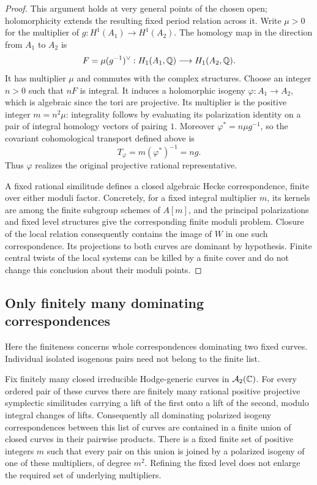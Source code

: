 \begin{proof}
This argument holds at very general points of the chosen open;
holomorphicity extends the resulting fixed period relation across it.
Write $\mu>0$ for the multiplier of
$g:H^1(A_1)\to H^1(A_2)$.  The homology map in the direction from $A_1$
to $A_2$ is
\[
 F=\mu(g^{-1})^\vee:H_1(A_1,\mathbb Q)\longrightarrow H_1(A_2,\mathbb Q).
\]
It has multiplier $\mu$ and commutes with the complex structures.
Choose an integer $n>0$ such that $nF$ is integral.  It induces a
holomorphic isogeny $\varphi:A_1\to A_2$, which is algebraic since the
tori are projective.  Its multiplier is the positive integer
$m=n^2\mu$: integrality follows by evaluating its polarization identity
on a pair of integral homology vectors of pairing $1$.
Moreover $\varphi^*=n\mu g^{-1}$, so the covariant cohomological
transport defined above is
\[
 T_\varphi=m(\varphi^*)^{-1}=ng.
\]
Thus $\varphi$ realizes the original projective rational representative.

A fixed rational similitude defines a
closed algebraic Hecke correspondence, finite over either moduli
factor.  Concretely, for a fixed integral multiplier $m$, its kernels
are among the finite subgroup schemes of $A[m]$, and the principal
polarizations and fixed level structures give the corresponding finite
moduli problem.  Closure of the local relation consequently contains
the image of $W$ in one such correspondence.  Its projections to both
curves are dominant by hypothesis.  Finite central twists of the local
systems can be killed by a finite cover and do not change this
conclusion about their moduli points.
\end{proof}

\subsection{Only finitely many dominating correspondences}

Here the finiteness concerns whole correspondences dominating two fixed
curves.  Individual isolated isogenous pairs need not belong to the
finite list.

\begin{proposition}
\label{prop:finite-correspondences}
Fix finitely many closed irreducible Hodge-generic curves in
$\mathcal A_2(\mathbb C)$.  For every ordered pair of these curves there are finitely
many rational positive projective symplectic similitudes carrying a
lift of the first onto a lift of the second, modulo integral changes
of lifts.  Consequently all dominating polarized isogeny
correspondences between this list of curves are contained in a finite
union of closed curves in their pairwise products.  There is a fixed
finite set of positive integers $m$ such that every pair on this union
is joined by a polarized isogeny of one of these multipliers, of degree
$m^2$.  Refining the fixed level does not enlarge the required set of
underlying multipliers.
\end{proposition}

